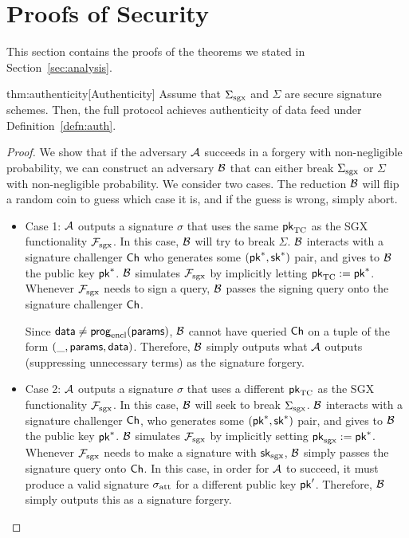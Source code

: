 
\section{Proofs of Security}
\label{sec:analysis-proofs}

This section contains the proofs of the theorems we stated in Section~\ref{sec:analysis}.


\begin{retheorem}{thm:authenticity}[Authenticity]
Assume that ${\Sigma_{\textrm{sgx}}}$ and $\Sigma$ are secure signature schemes.
Then, the full \tc protocol achieves authenticity of data feed under Definition~\ref{defn:auth}.
\end{retheorem}

\begin{proof}
We show that if the 
adversary $\mathcal{A}$ succeeds in a forgery with non-negligible probability,
we can construct an adversary $\mathcal{B}$ that can either
break ${\Sigma_{\textrm{sgx}}}$ or $\Sigma$ with non-negligible probability.
We consider two cases. 
The reduction $\mathcal{B}$ will flip a random coin to guess which
case it is, and if the guess is wrong, simply abort.
\begin{itemize}[leftmargin=5mm]
\item
Case 1: $\mathcal{A}$ outputs a signature $\sigma$ that uses the same  
${\sf pk}_{\textrm{TC}}$ as the SGX functionality $\mathcal{F}_{\textrm{sgx}}$.
In this case, $\mathcal{B}$ will try to break $\Sigma$. 
$\mathcal{B}$ interacts with a signature challenger ${\sf Ch}$ who generates
some $({\sf pk}^*, {\sf sk}^*)$ pair, and gives to $\mathcal{B}$ the public key
${\sf pk}^*$. $\mathcal{B}$ simulates 
$\mathcal{F}_{\textrm{sgx}}$ by implicitly letting ${\sf pk}_{\textrm{TC}} := {\sf pk}^*$.
Whenever $\mathcal{F}_{\textrm{sgx}}$ needs to sign a query, $\mathcal{B}$ passes the signing query
onto the signature challenger ${\sf Ch}$.

Since ${\sf data} \neq {\sf prog}_{\textrm{encl}}({\sf params})$,
$\mathcal{B}$ cannot have queried ${\sf Ch}$  
on a tuple of the form $(\_, {\sf params}, {\sf data})$. 
Therefore, $\mathcal{B}$ simply outputs 
what $\mathcal{A}$ 
outputs (suppressing unnecessary terms) as the signature forgery. 

\item
Case 2:
 $\mathcal{A}$ outputs a signature $\sigma$ that uses a different 
${\sf pk}_{\textrm{TC}}$ as the SGX functionality $\mathcal{F}_{\textrm{sgx}}$.
In this case, $\mathcal{B}$ will seek to break ${\Sigma_{\textrm{sgx}}}$.
$\mathcal{B}$ interacts with a signature challenger ${\sf Ch}$, who generates
some $({\sf pk}^*, {\sf sk}^*)$ pair, and gives to $\mathcal{B}$ the public key
${\sf pk}^*$. $\mathcal{B}$ simulates $\mathcal{F}_{\textrm{sgx}}$ by implicitly setting
${\sf pk}_{\mathrm{sgx}} := {\sf pk}^*$.
Whenever $\mathcal{F}_{\textrm{sgx}}$ needs to make a signature
with ${\sf sk}_{\mathrm{sgx}}$, 
$\mathcal{B}$ simply passes the signature query onto ${\sf Ch}$.
In this case, in order for $\mathcal{A}$ to succeed,
it must produce a valid signature ${\sigma_{\textrm{att}}}$ 
for a different public key ${\sf pk}'$.
Therefore, $\mathcal{B}$ simply outputs this as a signature forgery.
\end{itemize}
\end{proof}





